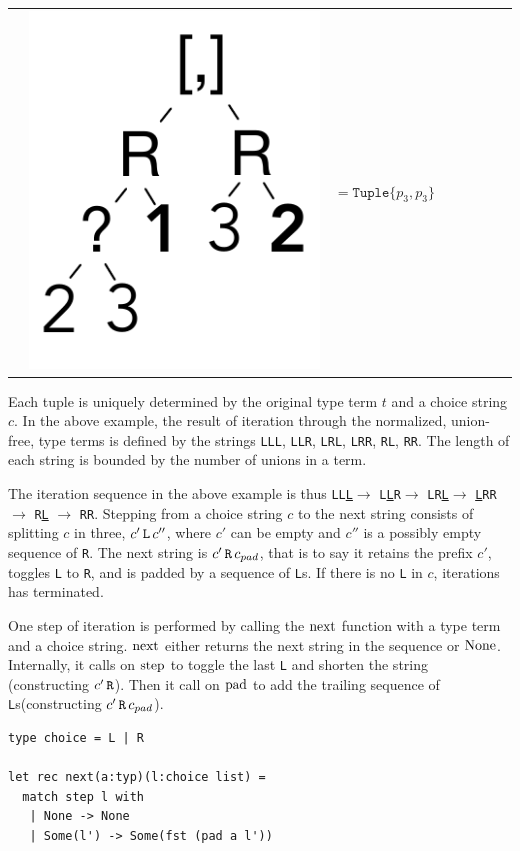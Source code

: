 \documentclass[a4paper,english]{lipics-v2019}
\newcommand{\xt}[1]{\texttt{#1}}
\renewcommand{\L}{{\tt L}\xspace}
\newcommand{\Ls}{{\tt L}s\xspace}
\newcommand{\R}{{\tt R}\xspace}
\newcommand{\uL}{{\underline{\tt L}}\xspace}
\renewcommand{\c}[1]{\ensuremath{\text{\lstinline{#1}}}\xspace}
\newcommand{\tuple}[1]{\xt{Tuple\{}#1\xt{\}}}
\begin{document}
{\begin{tabular}{@{}l@{~}ll@{~}ll@{~}ll@{~}l}
&\begin{minipage}{1.2cm}\includegraphics[scale=.25]{figures/tree7.pdf} 
\end{minipage} &  $ =   \tuple{p_3,p_3} $ 
\end{tabular}}

\medskip
\noindent 
Each tuple is uniquely determined by the original type term $t$ and a choice
string $c$. In the above example, the result of iteration through the
normalized, union-free, type terms is defined by the strings \L\L\L, \L\L\R,
\L\R\L, \L\R\R, \R\L, \R\R. The length of each string is bounded by the
number of unions in a term.


The iteration sequence in the above example is thus \L\L\uL $\rightarrow$
\L\uL\R $\rightarrow$ \L\R\uL $\rightarrow$ \uL\R\R $\rightarrow$ \R\uL
$\rightarrow$ \R\R. Stepping from a choice string $c$ to the next string
consists of splitting $c$ in three, $c' \,\L\,c''$, where $c'$ can be empty
and $c''$ is a possibly empty sequence of \R.  The next string is $c'\, \R
\, c_{pad}$, that is to say it retains the prefix $c'$, toggles \L to \R,
and is padded by a sequence of \Ls.  If there is no \L in $c$, iterations has
terminated.

One step of iteration is performed by calling the \c{next} function with a
type term and a choice string. \c{next} either returns the next string in
the sequence or \c{None}. Internally, it calls on \c{step} to toggle the
last \L and shorten the string (constructing $c'\,\R$). Then it call on
\c{pad} to add the trailing sequence of \Ls (constructing $c'\,\R\,c_{pad}$).

\begin{lstlisting}
type choice = L | R

let rec next(a:typ)(l:choice list) = 
  match step l with
   | None -> None
   | Some(l') -> Some(fst (pad a l'))
\end{lstlisting}
\end{document}
